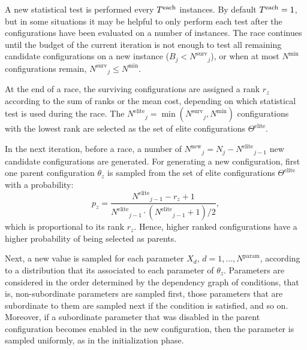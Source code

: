 \documentclass[article,a4paper,nojss,notitle]{jss}
\newcommand{\iter}{\ensuremath{j}\xspace}
\newcommand{\Budget}{\ensuremath{B}\xspace}
\newcommand{\Budgetj}{\ensuremath{\Budget_{\iter}}\xspace}
\newcommand{\Ncand}[1][]{\ensuremath{N_{#1}}\xspace}
\newcommand{\Nparam}{\ensuremath{{N^\text{param}}}\xspace}
\newcommand{\Nmin}{\ensuremath{N^\text{min}}\xspace}
\newcommand{\Nsurv}{\ensuremath{N^\text{surv}}\xspace}
\newcommand{\Nelite}{\ensuremath{N^\text{elite}}\xspace}
\newcommand{\Nnew}{\ensuremath{N^\text{new}}\xspace}
\newcommand{\Celite}{\ensuremath{\Theta^\text{elite}}\xspace}
\newcommand{\parameter}[1]{\code{#1}}
\renewcommand{\enspace}{}
\begin{document}
A new statistical test is performed every $T^\text{each}$ instances. By
default $T^\text{each}=1$, but in some situations it may be helpful to only
perform each test after the configurations have been evaluated on a
number of instances.  The race continues until the budget of the
current iteration is not enough to test all remaining candidate
configurations on a new instance ($\Budgetj < \Nsurv_{\iter}$), or when at
most $\Nmin$ configurations remain, $\Nsurv_{\iter} \leq \Nmin$.



At the end of a race, the surviving configurations are assigned a rank
$r_z$ according to the sum of ranks or the mean cost, depending on
which statistical test is used during the race. The $\Nelite_{\iter} =
\min(\Nsurv_{\iter}, \Nmin)$ configurations with the lowest rank are selected
as the set of elite configurations $\Celite$.

In the next iteration, before a race, a number of $\Nnew_{\iter} = \Ncand[\iter] - \Nelite_{\iter-1}$ new
candidate configurations are generated. For generating a new
configuration, first one parent configuration $\theta_z$ is
sampled from the set of elite configurations $\Celite$
with a probability:
%
\begin{equation}\label{eq:weight}
  p_z = \frac{\Nelite_{\iter-1} - r_z + 1}{\Nelite_{\iter-1} \cdot (\Nelite_{\iter-1} + 1) /2}\enspace,
\end{equation}
%
which is proportional to its rank $r_z$. Hence, higher ranked
configurations have a higher probability of being selected as parents.

Next, a new value is sampled for each parameter $X_d$,
$d=1,\dotsc,\Nparam$, according to a distribution that its associated
to each parameter of $\theta_z$. Parameters are considered in the
order determined by the dependency graph of conditions, that is,
non-subordinate parameters are sampled first, those parameters that are
subordinate to them are sampled next if the condition is satisfied,
and so on. Moreover, if a subordinate parameter that was disabled in
the parent configuration becomes enabled in the new configuration,
then the parameter is sampled uniformly, as in the initialization
phase.
\end{document}
